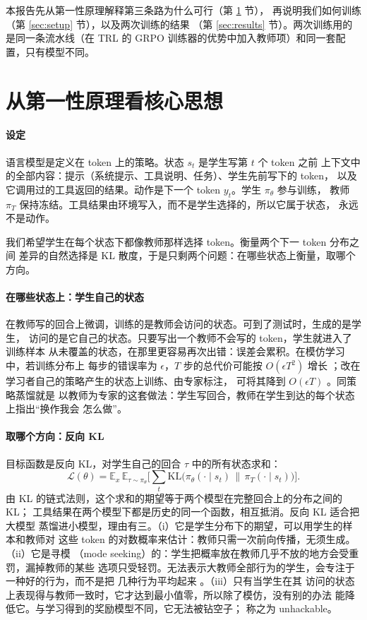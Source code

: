 \documentclass[11pt,a4paper,fontset=none]{ctexart}
\newcommand{\pis}{\pi_\theta}
\newcommand{\pit}{\pi_T}
\newcommand{\KL}{\mathrm{KL}}
\newcommand{\E}{\mathbb{E}}
\begin{document}
本报告先从第一性原理解释第三条路为什么可行（第 \ref{sec:principle} 节），
再说明我们如何训练（第 \ref{sec:setup} 节），以及两次训练的结果
（第 \ref{sec:results} 节）。两次训练用的是同一条流水线（在 TRL 的 GRPO
训练器的优势中加入教师项）和同一套配置，只有模型不同。

\section{从第一性原理看核心思想}
\label{sec:principle}

\paragraph{设定}
语言模型是定义在 token 上的策略。状态 $s_t$ 是学生写第 $t$ 个 token 之前
上下文中的全部内容：提示（系统提示、工具说明、任务）、学生先前写下的 token，
以及它调用过的工具返回的结果。动作是下一个 token $y_t$。学生 $\pis$ 参与训练，
教师 $\pit$ 保持冻结。工具结果由环境写入，而不是学生选择的，所以它属于状态，
永远不是动作。

我们希望学生在每个状态下都像教师那样选择 token。衡量两个下一 token 分布之间
差异的自然选择是 KL 散度，于是只剩两个问题：在哪些状态上衡量，取哪个方向。

\paragraph{在哪些状态上：学生自己的状态}
在教师写的回合上微调，训练的是教师会访问的状态。可到了测试时，生成的是学生，
访问的是它自己的状态。只要写出一个教师不会写的 token，学生就进入了训练样本
从未覆盖的状态，在那里更容易再次出错：误差会累积。在模仿学习中，若训练分布上
每步的错误率为 $\epsilon$，$T$ 步的总代价可能按 $O(\epsilon T^2)$ 增长
\citep{ross2010efficient}；改在学习者自己的策略产生的状态上训练、由专家标注，
可将其降到 $O(\epsilon T)$ \citep[DAgger;][]{ross2011dagger}。同策略蒸馏就是
以教师为专家的这套做法：学生写回合，教师在学生到达的每个状态上指出“换作我会
怎么做”。

\paragraph{取哪个方向：反向 KL}
目标函数是反向 KL，对学生自己的回合 $\tau$ 中的所有状态求和：
\begin{equation}
  \mathcal{L}(\theta) = \E_{x}\,\E_{\tau\sim\pis}\Big[\sum_{t}
  \KL\big(\pis(\cdot\mid s_t)\,\big\|\,\pit(\cdot\mid s_t)\big)\Big].
  \label{eq:objective}
\end{equation}
由 KL 的链式法则，这个求和的期望等于两个模型在完整回合上的分布之间的 KL；
工具结果在两个模型下都是历史的同一个函数，相互抵消。反向 KL 适合把大模型
蒸馏进小模型，理由有三。（i）它是学生分布下的期望，可以用学生的样本和教师对
这些 token 的对数概率来估计：教师只需一次前向传播，无须生成。（ii）它是寻模
（mode seeking）的：学生把概率放在教师几乎不放的地方会受重罚，漏掉教师的某些
选项只受轻罚。无法表示大教师全部行为的学生，会专注于一种好的行为，而不是把
几种行为平均起来 \citep{gu2024minillm,lu2025onpolicy}。（iii）只有当学生在其
访问的状态上表现得与教师一致时，它才达到最小值零，所以除了模仿，没有别的办法
能降低它。与学习得到的奖励模型不同，它无法被钻空子；\citet{lu2025onpolicy}
称之为 unhackable。
\end{document}
